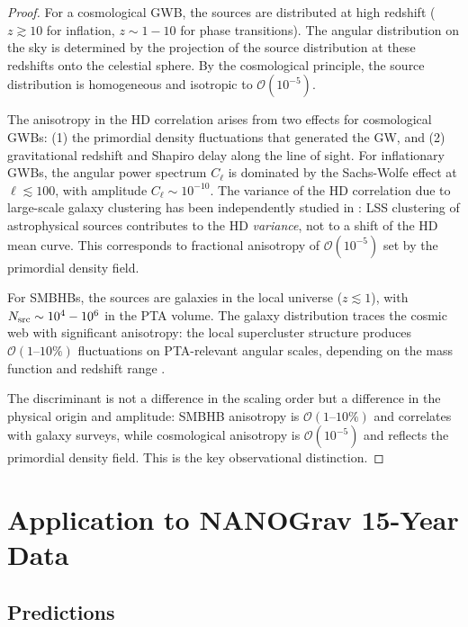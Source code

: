 \documentclass[11pt,a4paper]{article}
\begin{document}
\begin{proof}
For a cosmological GWB, the sources are distributed at high redshift ($z \gtrsim 10$ for inflation, $z \sim 1-10$ for phase transitions). The angular distribution on the sky is determined by the projection of the source distribution at these redshifts onto the celestial sphere. By the cosmological principle, the source distribution is homogeneous and isotropic to $\mathcal{O}(10^{-5})$.

The anisotropy in the HD correlation arises from two effects for cosmological GWBs: (1) the primordial density fluctuations that generated the GW, and (2) gravitational redshift and Shapiro delay along the line of sight. For inflationary GWBs, the angular power spectrum $C_\ell$ is dominated by the Sachs-Wolfe effect at $\ell \lesssim 100$, with amplitude $C_\ell \sim 10^{-10}$. The variance of the HD correlation due to large-scale galaxy clustering has been independently studied in \cite{Grimm:2025}: LSS clustering of astrophysical sources contributes to the HD \emph{variance}, not to a shift of the HD mean curve. This corresponds to fractional anisotropy of $\mathcal{O}(10^{-5})$ set by the primordial density field.

For SMBHBs, the sources are galaxies in the local universe ($z \lesssim 1$), with $N_{\rm src} \sim 10^4-10^6$ in the PTA volume. The galaxy distribution traces the cosmic web with significant anisotropy: the local supercluster structure produces $\mathcal{O}(1\text{--}10\%)$ fluctuations on PTA-relevant angular scales, depending on the mass function and redshift range \cite{Grimm:2025}.

The discriminant is not a difference in the scaling order but a difference in the physical origin and amplitude: SMBHB anisotropy is $\mathcal{O}(1\text{--}10\%)$ and correlates with galaxy surveys, while cosmological anisotropy is $\mathcal{O}(10^{-5})$ and reflects the primordial density field. This is the key observational distinction.
\end{proof}

\section{Application to NANOGrav 15-Year Data}\label{sec:phenomenology}

\subsection{Predictions}\label{sec:predictions}
\end{document}
